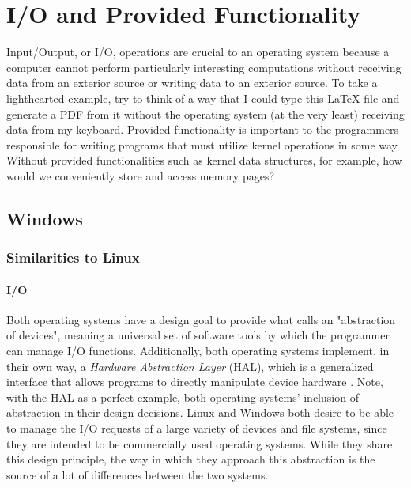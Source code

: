 \documentclass[letterpaper,10pt,titlepage]{article}
\begin{document}
% 
%
%

\section{I/O and Provided Functionality}
Input/Output, or I/O, operations are crucial to an operating system because a computer cannot perform particularly interesting computations without receiving data from an exterior source or writing data to an exterior source. To take a lighthearted example, try to think of a way that I could type this LaTeX file and generate a PDF from it without the operating system (at the very least) receiving data from my keyboard. Provided functionality is important to the programmers responsible for writing programs that must utilize kernel operations in some way. Without provided functionalities such as kernel data structures, for example, how would we conveniently store and access memory pages? 

\subsection{Windows}

\subsubsection{Similarities to Linux}

% 
%
%

\paragraph{I/O}
Both operating systems have a design goal to provide what \cite{windows2} calls an "abstraction of devices", meaning a universal set of software tools by which the programmer can manage I/O functions. Additionally, both operating systems implement, in their own way, a \emph{Hardware Abstraction Layer} (HAL), which is a generalized interface that allows programs to directly manipulate device hardware \cite{windows1}.
Note, with the HAL as a perfect example, both operating systems' inclusion of abstraction in their design decisions. Linux and Windows both desire to be able to manage the I/O requests of a large variety of devices and file systems, since they are intended to be commercially used operating systems. While they share this design principle, the way in which they approach this abstraction is the source of a lot of differences between the two systems.
\end{document}
